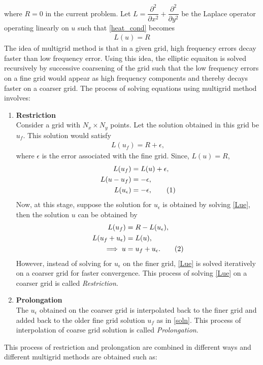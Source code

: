 \documentclass[11pt]{report}
\newcommand\numberthis{\addtocounter{equation}{1}\tag{\theequation}}
\begin{document}
\begin{enumerate}
where $R=0$ in the current problem.
Let $L=\dfrac{\partial^2 }{\partial x^2}+\dfrac{\partial^2 }{\partial y^2}$ be the Laplace operator operating linearly on $u$ such that \eqref{heat_cond} becomes
\begin{align}
L(u)=R \label{heat_cond_L}
\end{align}
The idea of multigrid method is that in a given grid, high frequency errors decay faster than low frequency error.
Using this idea, the elliptic equaiton is solved recursively by successive coarsening of the grid such that the low frequency errors on a fine grid would appear as high frequency components and thereby  decays faster on a 
coarser grid.  The process of solving equations using multigrid method involves:
\begin{enumerate}
\item \textbf{Restriction}\\
Consider a grid with $N_x\times N_y$ points. Let the solution obtained in this grid be $u_f$. This solution would satisfy
\begin{align*}
L(u_f)=R+\epsilon,
\end{align*}
where $\epsilon$ is the error associated with the fine grid. Since, $L(u)=R$, 
\begin{align*}
L(u_f)&=L(u)+\epsilon,\\
L(u-u_f)&=-\epsilon,\\
L(u_\epsilon)&=-\epsilon, \numberthis \label{Lue}
\end{align*}
Now, at this stage, suppose the solution for $u_\epsilon$ is obtained by solving \eqref{Lue}, then the solution $u$ can be obtained by
\begin{align*}
L(u_f)&=R-L(u_\epsilon),\\
L(u_f+u_\epsilon)&=L(u),\\
\implies u&=u_f+u_\epsilon. \numberthis \label{soln}
\end{align*} 
However, instead of solving for $u_\epsilon$ on the finer grid, \eqref{Lue} is solved iteratively on a coarser grid 
for faster convergence. This process of solving \eqref{Lue} on a coarser grid is called \emph{Restriction}.
\item \textbf{Prolongation}\\
The $u_\epsilon$ obtained on the coarser grid is interpolated back to the finer grid and added back to the older fine grid solution $u_f$ as in \eqref{soln}. This process of interpolation of coarse grid solution is called \emph{Prolongation}.
\end{enumerate}
This process of restriction and prolongation are combined in different ways and different multigrid methods are obtained such as:

\end{enumerate}
\end{document}
